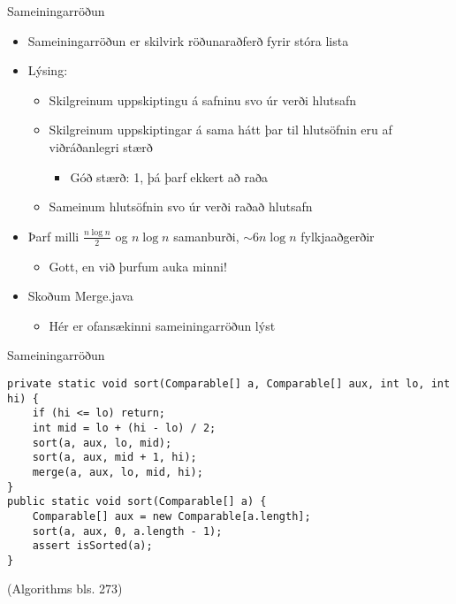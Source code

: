 \documentclass{beamer}
\begin{document}
\begin{frame}{Sameiningarröðun}
	\begin{itemize}
		\item Sameiningarröðun  er skilvirk röðunaraðferð fyrir stóra lista
		\item Lýsing:
		      \begin{itemize}
			      \item Skilgreinum uppskiptingu á safninu svo úr verði hlutsafn
                  \item Skilgreinum uppskiptingar á sama hátt þar til hlutsöfnin eru af viðráðanlegri stærð
                  \begin{itemize}
                      \item Góð stærð: 1, þá þarf ekkert að raða
                  \end{itemize}
			      \item Sameinum hlutsöfnin svo úr verði raðað hlutsafn
		      \end{itemize}
		\item Þarf milli $\frac{n \log n}{2}$ og $n \log n$ samanburði, $\sim 6n\log n$ fylkjaaðgerðir
		      \begin{itemize}
			      \item Gott, en við þurfum auka minni!
		      \end{itemize}
		\item Skoðum Merge.java
		      \begin{itemize}
			      \item Hér er ofansækinni  sameiningarröðun lýst
		      \end{itemize}
	\end{itemize}
\end{frame}

\begin{frame}[fragile]{Sameiningarröðun}
	\begin{verbatim}
private static void sort(Comparable[] a, Comparable[] aux, int lo, int hi) {
    if (hi <= lo) return;
    int mid = lo + (hi - lo) / 2;
    sort(a, aux, lo, mid);
    sort(a, aux, mid + 1, hi);
    merge(a, aux, lo, mid, hi);
}
public static void sort(Comparable[] a) {
    Comparable[] aux = new Comparable[a.length];
    sort(a, aux, 0, a.length - 1);
    assert isSorted(a);
}
    \end{verbatim}
	(Algorithms bls. 273)
\end{frame}

{
\begin{frame}[plain]
\end{frame}
}
\end{document}
